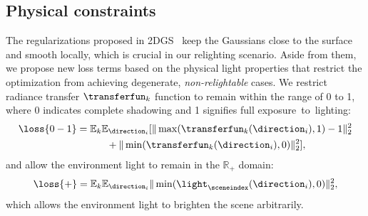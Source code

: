   \subsection{Physical constraints}
    \label{subsec:lumigauss-constraints}
    The regularizations proposed in 2DGS~\cite{huang20242d} keep the Gaussians
    close to the surface and smooth locally, which is crucial in our relighting
    scenario.
    Aside from them, we propose new loss terms based on the physical light
    properties that restrict the optimization from achieving degenerate,
    \textit{non-relightable} cases.
    We restrict radiance transfer $\transferfun_k$ function to remain within the range of 0 to 1, where 0 indicates complete shadowing and 1 signifies full exposure~to~lighting:
    \begin{equation}
      \begin{split}
        \loss{0-1} & =\mathbb{E}_k\mathbb{E}_{\direction_i} [\|\max(\transferfun_k(\direction_i), 1)-1\|^2_2 \\
                   & \qquad\quad+ \|\min(\transferfun_k(\direction_i), 0)\|^2_2],
      \end{split}
    \end{equation}
    and allow the environment light to remain in the $\mathbb{R}_{+}$ domain:
    \begin{equation}
      \loss{+} = \mathbb{E}_k\mathbb{E}_{\direction_i}\|\min(\light_\sceneindex(\direction_i), 0)\|^2_2,
    \end{equation}
    which allows the environment light to brighten the scene arbitrarily.

